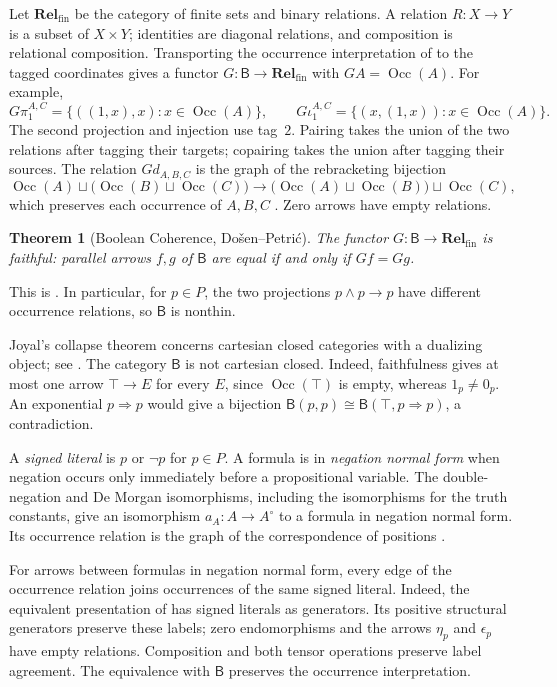 \documentclass[11pt]{article}
\newtheorem{theorem}{Theorem}[section]
\newcommand{\B}{\mathsf B}
\newcommand{\Occ}{\operatorname{Occ}}
\newcommand{\Rel}{\mathbf{Rel}_{\mathrm{fin}}}
\begin{document}
Let $\Rel$ be the category of finite sets and binary relations.
A relation $R:X\to Y$ is a subset of $X\times Y$; identities are
diagonal relations, and composition is relational composition.
Transporting the occurrence interpretation of \cite{DP} to the
tagged coordinates gives a functor
$G:\B\to\Rel$ with $GA=\Occ(A)$.
For example,
\[
 G\pi_1^{A,C}=\{((1,x),x):x\in\Occ(A)\},\qquad
 G\iota_1^{A,C}=\{(x,(1,x)):x\in\Occ(A)\}.
\]
The second projection and injection use tag~$2$. Pairing takes the
union of the two relations after tagging their targets; copairing
takes the union after tagging their sources. The relation $Gd_{A,B,C}$
is the graph of the rebracketing bijection
\[
 \Occ(A)\sqcup\bigl(\Occ(B)\sqcup\Occ(C)\bigr)
 \longrightarrow
 \bigl(\Occ(A)\sqcup\Occ(B)\bigr)\sqcup\Occ(C),
\]
which preserves each occurrence of $A,B,C$
\cite[\S2.9, p.~60]{DP}. Zero arrows have empty relations.

\begin{theorem}[Boolean Coherence, Do\v{s}en--Petri\'c]
\label{thm:coherence}
The functor $G:\B\to\Rel$ is faithful: parallel arrows $f,g$ of
$\B$ are equal if and only if $Gf=Gg$.
\end{theorem}

This is \cite[\S14.2, p.~321]{DP}. In particular, for $p\in P$, the
two projections $p\wedge p\to p$ have different occurrence
relations, so $\B$ is nonthin.

Joyal's collapse theorem concerns cartesian closed categories with a
dualizing object; see \cite[\S14.3, pp.~324--326]{DP}. The category
$\B$ is not cartesian closed. Indeed, faithfulness gives at most one
arrow $\top\to E$ for every $E$, since $\Occ(\top)$ is empty,
whereas $1_p\ne0_p$. An exponential $p\Rightarrow p$ would give
a bijection $\B(p,p)\cong\B(\top,p\Rightarrow p)$, a contradiction.

A \emph{signed literal} is $p$ or $\neg p$ for $p\in P$.
A formula is in \emph{negation normal form} when negation occurs only
immediately before a propositional variable. The double-negation and
De Morgan isomorphisms, including the isomorphisms for the truth
constants, give an isomorphism $a_A:A\to A^\circ$ to a formula in
negation normal form. Its occurrence relation is the graph of the
correspondence of positions \cite[\S14.1, pp.~313--315]{DP}.

For arrows between formulas in negation normal form, every edge of
the occurrence relation joins occurrences of the same signed literal.
Indeed, the equivalent presentation of \cite[\S14.2, pp.~318--321]{DP}
has signed literals as generators. Its positive structural generators
preserve these labels; zero endomorphisms and the arrows $\eta_p$ and
$\epsilon_p$ have empty relations. Composition and both tensor
operations preserve label agreement. The equivalence with $\B$ preserves the occurrence
interpretation.
\end{document}
